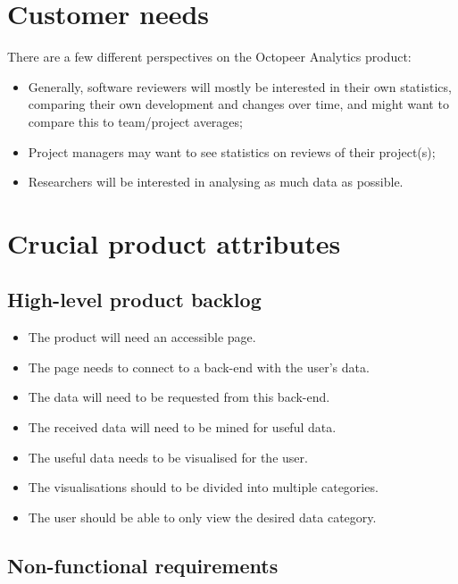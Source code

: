 \documentclass{article}
\begin{document}
\section{Customer needs} \label{section:customerneeds}
There are a few different perspectives on the Octopeer Analytics product:
\begin{itemize}
\item Generally, software reviewers will mostly be interested in their own statistics, comparing their own development and changes over time, and might want to compare this to team/project averages;
\item Project managers may want to see statistics on reviews of their project(s);
\item Researchers will be interested in analysing as much data as possible.
\end{itemize}

\section{Crucial product attributes} \label{section:crucialproductattributes}
\subsection{High-level product backlog} \label{section:highlevelproductbacklog}
    
    \begin{itemize}
        \item The product will need an accessible page.
        \item The page needs to connect to a back-end with the user's data.
        \item The data will need to be requested from this back-end.
        \item The received data will need to be mined for useful data.
        \item The useful data needs to be visualised for the user.
        \item The visualisations should to be divided into multiple categories.
        \item The user should be able to only view the desired data category.
    \end{itemize}

\subsection{Non-functional requirements} \label{section:nonfunctionalrequirements}
\end{document}
